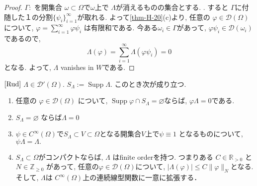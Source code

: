 \begin{proof}
\(\Gamma:\) を開集合 \(\omega \subset \Omega\)で$\omega$上で \(\Lambda\)が消えるものの集合とする. .  
すると \(\Gamma\)に付随した１の分割\(\{\psi_i\}_{i=1}^\infty\)が取れる. 
よって\ref{thm-H-20}(c)より, 任意の \(\varphi \in \mathcal{D}(\Omega)\)について, \(\varphi = \sum_{i=1}^\infty \varphi \psi_i\) は有限和である. 
今ある\(\omega_i \in \Gamma\)があって,  \(\varphi \psi_i \in \mathcal{D}(\omega_i)\) 
であるので, 
\[
\Lambda(\varphi) = \sum_{i=1}^\infty \Lambda(\varphi \psi_i) = 0
\]
となる. よって, 
\(\Lambda\) vanishes in \(W\)である. 
\end{proof}


\begin{tcolorbox}[mybox]
\begin{thm}{$\cite[Thm 6.24]{Rud}$}
\label{thm-H-25}
\(\Lambda \in \mathcal{D}'(\Omega)\).  
\(S_\Lambda := \operatorname{Supp} \Lambda\).  
このとき次が成り立つ. 
\begin{enumerate}[label=$(\alph*)$]
\item 任意の \( \varphi \in \mathcal{D}(\Omega)\) について, 
\(\operatorname{Supp}\varphi \cap S_\Lambda = \varnothing\)ならば, \(\varphi \Lambda = 0\)である.
\item \(S_\Lambda = \varnothing\) ならば\(\Lambda = 0\)  
\item  \(\psi \in C^\infty(\Omega)\)で\(S_{\Lambda} \subset V \subset \Omega\)となる開集合$V$上で\(\psi \equiv 1\) となるものについて,  \(\psi \Lambda = \Lambda.\)  
\item  \(S_\Lambda \subset \Omega\)がコンパクトならば,  \(\Lambda\) はfinite orderを持つ. 
つまりある \(C \in \mathbb{R}_{>0}\) と \(N \in \mathbb{Z}_{\ge 0}\) があって, 任意の$\varphi \in \mathcal{D}(\Omega)$について, \(|\Lambda(\varphi)| \le C \|\varphi\|_N \)となる. 
そして, \(\Lambda\)は \(C^\infty(\Omega)\)上の連続線型関数に一意に拡張する．  
\end{enumerate}
\end{thm}
\end{tcolorbox}


